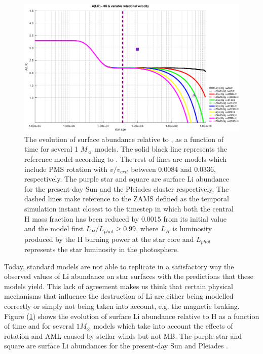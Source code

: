 \documentclass[fleqn,usenatbib]{mnras}
\begin{document}
\begin{figure}
	\includegraphics[width=\columnwidth]{figures/li_var_vel_0_0g.eps}
    \caption{The evolution of surface  abundance relative to , as a function of time for several 1 $M_{\sun}$ models. The solid black line represents the reference model according to \citet{Choi2016}. The rest of lines are models which include PMS rotation with $v/v_{crit}$ between 0.0084 and 0.0336, respectively. The purple star and square are surface Li abundance for the present-day Sun \citep{Asplund2009} and the Pleiades cluster \citep{Sestito2005} respectively. The dashed lines make reference to the ZAMS defined as the temporal simulation instant closest to the timestep in which both the central H mass fraction has been reduced by 0.0015 from its initial value and the model first $L_H/L_{phot} \geq 0.99$, where $L_{H}$ is luminosity produced by the H burning power at the star core and $L_{phot}$ represents the star luminosity in the photosphere.}
    \label{fig:li_var_vel_0g}
\end{figure}

Today, standard models are not able to replicate in a satisfactory way the observed values of Li abundance on star surfaces with the predictions that these models yield. This lack of agreement makes us think that certain physical mechanisms that influence the destruction of Li are either being modelled correctly or simply not being taken into account, e.g. the magnetic braking. Figure (\ref{fig:li_var_vel_0g}) shows the evolution of surface Li abundance relative to H as a function of time and for several $1M_{\odot}$ models which take into account the effects of rotation and AML caused by stellar winds but not MB. The purple star and square are surface Li abundances for the present-day Sun \citep{Asplund2009} and Pleiades \citep{Sestito2005}.\par
\end{document}
